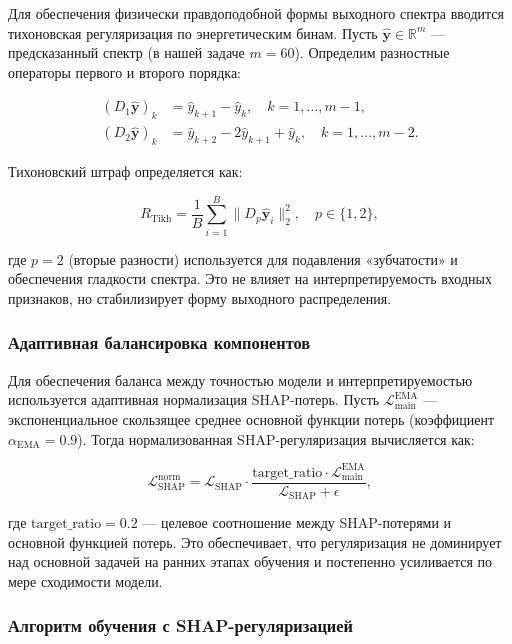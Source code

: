 Для обеспечения физически правдоподобной формы выходного спектра вводится тихоновская регуляризация по энергетическим бинам. Пусть $\hat{\mathbf{y}} \in \mathbb{R}^{m}$ --- предсказанный спектр (в нашей задаче $m=60$). Определим разностные операторы первого и второго порядка:

\begin{align}
(D_1 \hat{\mathbf{y}})_k &= \hat{y}_{k+1} - \hat{y}_k, \quad k = 1, \ldots, m-1, \\
(D_2 \hat{\mathbf{y}})_k &= \hat{y}_{k+2} - 2\hat{y}_{k+1} + \hat{y}_k, \quad k = 1, \ldots, m-2.
\end{align}

Тихоновский штраф определяется как:

\begin{equation}
R_{\text{Tikh}} = \frac{1}{B} \sum_{i=1}^{B} \| D_p \hat{\mathbf{y}}_i \|_2^2, \quad p \in \{1,2\},
\end{equation}

где $p=2$ (вторые разности) используется для подавления «зубчатости» и обеспечения гладкости спектра. Это не влияет на интерпретируемость входных признаков, но стабилизирует форму выходного распределения.

\subsubsection{Адаптивная балансировка компонентов}

Для обеспечения баланса между точностью модели и интерпретируемостью используется адаптивная нормализация SHAP-потерь. Пусть $\mathcal{L}_{\text{main}}^{\text{EMA}}$ --- экспоненциальное скользящее среднее основной функции потерь (коэффициент $\alpha_{\text{EMA}} = 0.9$). Тогда нормализованная SHAP-регуляризация вычисляется как:

\begin{equation}
\mathcal{L}_{\text{SHAP}}^{\text{norm}} = \mathcal{L}_{\text{SHAP}} \cdot \frac{\text{target\_ratio} \cdot \mathcal{L}_{\text{main}}^{\text{EMA}}}{\mathcal{L}_{\text{SHAP}} + \epsilon},
\end{equation}

где $\text{target\_ratio} = 0.2$ --- целевое соотношение между SHAP-потерями и основной функцией потерь. Это обеспечивает, что регуляризация не доминирует над основной задачей на ранних этапах обучения и постепенно усиливается по мере сходимости модели.

\subsubsection{Алгоритм обучения с SHAP-регуляризацией}

